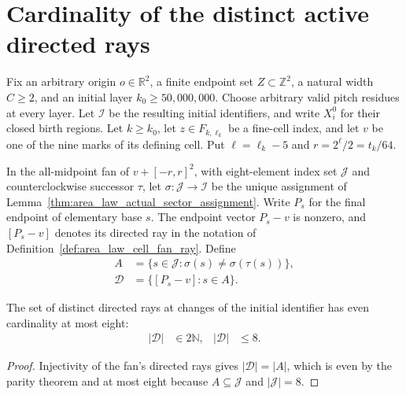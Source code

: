 \section{Cardinality of the distinct active directed rays}
\label{sec:area_law_initial_active_ray_cardinality}

Fix an arbitrary origin $o\in\mathbb R^2$, a finite endpoint set
$Z\subset\mathbb Z^2$, a natural width $C\ge2$, and an initial layer
$k_0\ge50{,}000{,}000$. Choose arbitrary valid pitch residues at every
layer. Let $\mathcal I$ be the resulting initial identifiers, and write
$X_i^0$ for their closed birth regions.
Let $k\ge k_0$, let $z\in F_{k,\ell_k}$ be a fine-cell index,
and let $v$ be one of the nine marks of its defining cell.
Put $\ell=\ell_k-5$ and $r=2^\ell/2=t_k/64$.

In the all-midpoint fan of $v+[-r,r]^2$, with eight-element
index set $\mathcal J$ and counterclockwise successor $\tau$,
let $\sigma:\mathcal J\to\mathcal I$ be the unique assignment
of Lemma~\ref{thm:area_law_actual_sector_assignment}.
Write $P_s$ for the final endpoint of elementary base $s$. The endpoint
vector $P_s-v$ is nonzero, and $[P_s-v]$ denotes its directed ray in the
notation of Definition~\ref{def:area_law_cell_fan_ray}. Define
\begin{align}
    A          & =\{s\in\mathcal J:\sigma(s)\ne\sigma(\tau(s))\}, \\
    \mathcal D & =\{[P_s-v]:s\in A\}.
\end{align}


\begin{lemma}
    \label{thm:area_law_initial_active_rays_cardinality}
    \leanok
    The set of distinct directed rays at changes of the initial
    identifier has even cardinality at most eight:
    \begin{align}
        |\mathcal D| & \in2\mathbb N, & |\mathcal D| & \le8.
    \end{align}
\end{lemma}
\begin{proof}\leanok
    Injectivity of the fan's directed rays gives $|\mathcal D|=|A|$,
    which is even by the parity theorem and at most eight because
    $A\subseteq\mathcal J$ and $|\mathcal J|=8$.
\end{proof}

